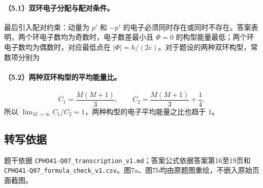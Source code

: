 \paragraph{（5.1）双环电子分配与配对条件。}
最后引入配对约束：动量为 $p'$ 和 $-p'$ 的电子必须同时存在或同时不存在。答案表明，两个环电子数均为奇数时，电子数差最小且 $\Phi=0$ 的构型能量最低；两个环电子数均为偶数时，对应最低点在 $\lvert\Phi\rvert=h/(2e)$。对于题设的两种双环构型，常数项分别为
\paragraph{（5.2）两种双环构型的平均能量比。}
\[C_1=\frac{M(M+1)}{3},\qquad C_2=\frac{M(M+1)}{3}+\frac14,\]
所以 $\lim_{M\to\infty}C_1/C_2=1$，两种构型的电子平均能量之比也趋于 $1$。
\subsection{转写依据}
题干依据 \texttt{CPHO41-Q07\_transcription\_v1.md}；答案公式依据答案第16至19页和 \texttt{CPHO41-Q07\_formula\_check\_v1.csv}。图7a、图7b均由原题图重绘，不嵌入原始页面截图。
